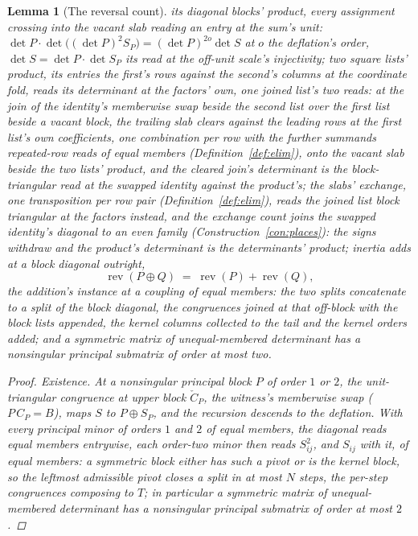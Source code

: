 \documentclass[11pt]{article}
\newtheorem{lemma}{Lemma}
\theoremstyle{definition}
\begin{document}
\begin{lemma}[The reversal count]
its diagonal blocks' product, every assignment crossing into the
vacant slab reading an entry at the sum's unit:
$\det P\cdot\det\big((\det P)^2S_P\big)=(\det P)^{2o}\det S$
at $o$ the deflation's order, $\det S=\det P\cdot\det S_P$ its
read at the off-unit scale's injectivity;
two square lists' \emph{product}, its entries the first's rows
against the second's columns at the coordinate fold, reads its
determinant at the factors' own, one joined list's two reads: at
the join of the identity's memberwise swap beside the second list
over the first list beside a vacant block, the trailing slab
clears against the leading rows at the first list's own
coefficients, one combination per row with the further summands
repeated-row reads of equal members
(Definition~\ref{def:elim}), onto the vacant slab beside the two
lists' product, and the cleared join's determinant is the
block-triangular read at the swapped identity against the
product's; the slabs' exchange, one transposition per row pair
(Definition~\ref{def:elim}), reads the joined list block
triangular at the factors instead, and the exchange count joins the swapped
identity's diagonal to an even family
(Construction~\ref{con:places}): the signs withdraw and the
product's determinant is the determinants' product;
inertia adds at a block diagonal outright,
\[
\operatorname{rev}(P\oplus Q)\;=\;
\operatorname{rev}(P)+\operatorname{rev}(Q) ,
\]
the addition's instance at a coupling of equal members: the two
splits concatenate to a split of the block diagonal, the
congruences joined at that off-block with the block lists appended,
the kernel columns collected to the tail and the kernel orders
added;
and a symmetric matrix of unequal-membered determinant has a
nonsingular principal submatrix of order at most two.
\begin{proof}
\emph{Existence.} At a nonsingular principal block $P$ of order $1$
or $2$, the unit-triangular congruence at upper block $\check C_P$,
the witness's memberwise swap ($P\,C_P=B$),
maps $S$ to $P\oplus S_P$, and the recursion descends to the
deflation. With every principal minor of orders $1$ and $2$
of equal members, the diagonal reads equal members entrywise, each
order-two minor then reads $S_{ij}^{2}$, and $S_{ij}$ with it, of
equal members: a symmetric
block either has such a pivot or is the kernel block, so the
leftmost admissible pivot closes a split in at most $N$ steps, the
per-step congruences composing to $T$; in particular a symmetric
matrix of unequal-membered determinant has a nonsingular principal
submatrix of order at most $2$.


\end{proof}
\end{lemma}
\end{document}

